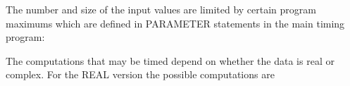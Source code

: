The number and size of the input values are limited by certain program
maximums which are defined in PARAMETER statements in the
main timing program:


The computations that may be timed depend on whether the data is real
or complex.
For the REAL version the possible computations are
